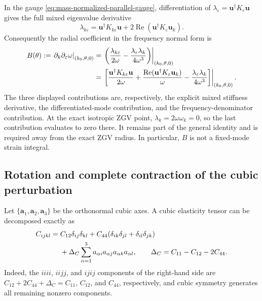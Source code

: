 In the gauge \eqref{eq:mass-normalized-parallel-gauge}, differentiation of
\(\lambda_\varepsilon=\mathbf u^\dagger K_\varepsilon\mathbf u\)
gives the full mixed eigenvalue derivative
\begin{equation}
  \lambda_{k\varepsilon}
  =\mathbf u^\dagger K_{k\varepsilon}\mathbf u
   +2\operatorname{Re}
     (\mathbf u^\dagger K_\varepsilon\mathbf u_k).
  \label{eq:complete-mixed-eigenvalue-derivative}
\end{equation}
Consequently the radial coefficient in the frequency normal form is
\begin{align}
  B(\theta)
  :=\left.\partial_k\partial_\varepsilon\omega
    \right|_{(k_0,\theta,0)}
  &=\left.
    \left(
      \frac{\lambda_{k\varepsilon}}{2\omega}
      -\frac{\lambda_\varepsilon\lambda_k}{4\omega^3}
    \right)\right|_{(k_0,\theta,0)}                                  \notag\\
  &=\left.
    \left[
      \frac{\mathbf u^\dagger K_{k\varepsilon}\mathbf u}{2\omega}
      +\frac{\operatorname{Re}
        (\mathbf u^\dagger K_\varepsilon\mathbf u_k)}{\omega}
      -\frac{\lambda_\varepsilon\lambda_k}{4\omega^3}
    \right]\right|_{(k_0,\theta,0)}.
  \label{eq:complete-radial-frequency-sensitivity}
\end{align}
The three displayed contributions are, respectively, the explicit mixed
stiffness derivative, the differentiated-mode contribution, and the
frequency-denominator contribution.  At the exact isotropic ZGV point,
\(\lambda_k=2\omega\omega_k=0\), so the last contribution evaluates to
zero there.  It remains part of the general identity and is required away
from the exact ZGV radius.  In particular, \(B\) is not a fixed-mode strain
integral.

\subsection{Rotation and complete contraction of the cubic perturbation}

Let \(\{\mathbf a_1,\mathbf a_2,\mathbf a_3\}\) be the orthonormal cubic
axes.  A cubic elasticity tensor can be decomposed exactly as
\begin{align}
  C_{ijkl}
  ={}&C_{12}\delta_{ij}\delta_{kl}
   +C_{44}(\delta_{ik}\delta_{jl}+\delta_{il}\delta_{jk})
  \notag\\
  &+\Delta_C\sum_{\alpha=1}^{3}
      a_{\alpha i}a_{\alpha j}a_{\alpha k}a_{\alpha l},
  \qquad
  \Delta_C=C_{11}-C_{12}-2C_{44}.
  \label{eq:cubic-tensor-decomposition}
\end{align}
Indeed, the \(iiii\), \(iijj\), and \(ijij\) components of the right-hand
side are \(C_{12}+2C_{44}+\Delta_C=C_{11}\), \(C_{12}\), and
\(C_{44}\), respectively, and cubic symmetry generates all remaining
nonzero components.


